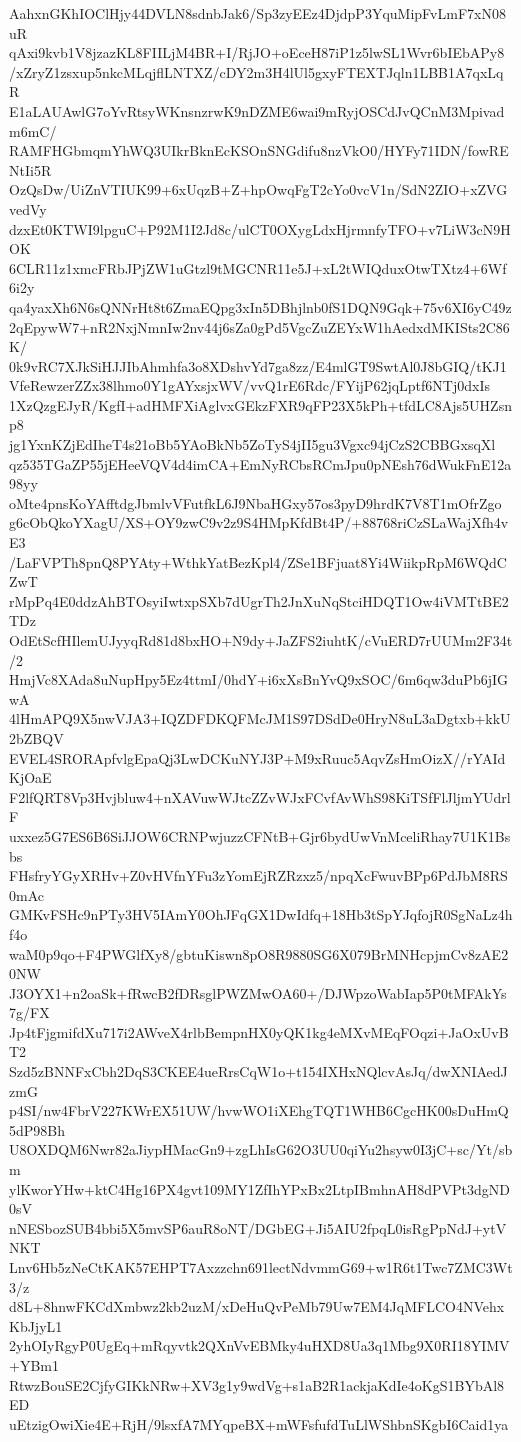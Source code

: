 AahxnGKhIOClHjy44DVLN8sdnbJak6/Sp3zyEEz4DjdpP3YquMipFvLmF7xN08uR
qAxi9kvb1V8jzazKL8FIILjM4BR+I/RjJO+oEceH87iP1z5lwSL1Wvr6bIEbAPy8
/xZryZ1zsxup5nkcMLqjflLNTXZ/cDY2m3H4lUl5gxyFTEXTJqln1LBB1A7qxLqR
E1aLAUAwlG7oYvRtsyWKnsnzrwK9nDZME6wai9mRyjOSCdJvQCnM3Mpivadm6mC/
RAMFHGbmqmYhWQ3UIkrBknEcKSOnSNGdifu8nzVkO0/HYFy71IDN/fowRENtIi5R
OzQsDw/UiZnVTIUK99+6xUqzB+Z+hpOwqFgT2cYo0vcV1n/SdN2ZIO+xZVGvedVy
dzxEt0KTWI9lpguC+P92M1I2Jd8c/ulCT0OXygLdxHjrmnfyTFO+v7LiW3cN9HOK
6CLR11z1xmcFRbJPjZW1uGtzl9tMGCNR11e5J+xL2tWIQduxOtwTXtz4+6Wf6i2y
qa4yaxXh6N6sQNNrHt8t6ZmaEQpg3xIn5DBhjlnb0fS1DQN9Gqk+75v6XI6yC49z
2qEpywW7+nR2NxjNmnIw2nv44j6sZa0gPd5VgcZuZEYxW1hAedxdMKISts2C86K/
0k9vRC7XJkSiHJJIbAhmhfa3o8XDshvYd7ga8zz/E4mlGT9SwtAl0J8bGIQ/tKJ1
VfeRewzerZZx38lhmo0Y1gAYxsjxWV/vvQ1rE6Rdc/FYijP62jqLptf6NTj0dxIs
1XzQzgEJyR/KgfI+adHMFXiAglvxGEkzFXR9qFP23X5kPh+tfdLC8Ajs5UHZsnp8
jg1YxnKZjEdIheT4s21oBb5YAoBkNb5ZoTyS4jII5gu3Vgxc94jCzS2CBBGxsqXl
qz535TGaZP55jEHeeVQV4d4imCA+EmNyRCbsRCmJpu0pNEsh76dWukFnE12a98yy
oMte4pnsKoYAfftdgJbmlvVFutfkL6J9NbaHGxy57os3pyD9hrdK7V8T1mOfrZgo
g6cObQkoYXagU/XS+OY9zwC9v2z9S4HMpKfdBt4P/+88768riCzSLaWajXfh4vE3
/LaFVPTh8pnQ8PYAty+WthkYatBezKpl4/ZSe1BFjuat8Yi4WiikpRpM6WQdCZwT
rMpPq4E0ddzAhBTOsyiIwtxpSXb7dUgrTh2JnXuNqStciHDQT1Ow4iVMTtBE2TDz
OdEtScfHIlemUJyyqRd81d8bxHO+N9dy+JaZFS2iuhtK/cVuERD7rUUMm2F34t/2
HmjVc8XAda8uNupHpy5Ez4ttmI/0hdY+i6xXsBnYvQ9xSOC/6m6qw3duPb6jIGwA
4lHmAPQ9X5nwVJA3+IQZDFDKQFMcJM1S97DSdDe0HryN8uL3aDgtxb+kkU2bZBQV
EVEL4SRORApfvlgEpaQj3LwDCKuNYJ3P+M9xRuuc5AqvZsHmOizX//rYAIdKjOaE
F2lfQRT8Vp3Hvjbluw4+nXAVuwWJtcZZvWJxFCvfAvWhS98KiTSfFlJljmYUdrlF
uxxez5G7ES6B6SiJJOW6CRNPwjuzzCFNtB+Gjr6bydUwVnMceliRhay7U1K1Bsbs
FHsfryYGyXRHv+Z0vHVfnYFu3zYomEjRZRzxz5/npqXcFwuvBPp6PdJbM8RS0mAc
GMKvFSHc9nPTy3HV5IAmY0OhJFqGX1DwIdfq+18Hb3tSpYJqfojR0SgNaLz4hf4o
waM0p9qo+F4PWGlfXy8/gbtuKiswn8pO8R9880SG6X079BrMNHcpjmCv8zAE20NW
J3OYX1+n2oaSk+fRwcB2fDRsglPWZMwOA60+/DJWpzoWabIap5P0tMFAkYs7g/FX
Jp4tFjgmifdXu717i2AWveX4rlbBempnHX0yQK1kg4eMXvMEqFOqzi+JaOxUvBT2
Szd5zBNNFxCbh2DqS3CKEE4ueRrsCqW1o+t154IXHxNQlcvAsJq/dwXNIAedJzmG
p4SI/nw4FbrV227KWrEX51UW/hvwWO1iXEhgTQT1WHB6CgcHK00sDuHmQ5dP98Bh
U8OXDQM6Nwr82aJiypHMacGn9+zgLhIsG62O3UU0qiYu2hsyw0I3jC+sc/Yt/sbm
ylKworYHw+ktC4Hg16PX4gvt109MY1ZfIhYPxBx2LtpIBmhnAH8dPVPt3dgND0sV
nNESbozSUB4bbi5X5mvSP6auR8oNT/DGbEG+Ji5AIU2fpqL0isRgPpNdJ+ytVNKT
Lnv6Hb5zNeCtKAK57EHPT7Axzzchn691lectNdvmmG69+w1R6t1Twc7ZMC3Wt3/z
d8L+8hnwFKCdXmbwz2kb2uzM/xDeHuQvPeMb79Uw7EM4JqMFLCO4NVehxKbJjyL1
2yhOIyRgyP0UgEq+mRqyvtk2QXnVvEBMky4uHXD8Ua3q1Mbg9X0RI18YIMV+YBm1
RtwzBouSE2CjfyGIKkNRw+XV3g1y9wdVg+s1aB2R1ackjaKdIe4oKgS1BYbAl8ED
uEtzigOwiXie4E+RjH/9lsxfA7MYqpeBX+mWFsfufdTuLlWShbnSKgbI6Caid1ya
